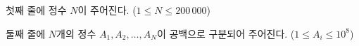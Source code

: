 첫째 줄에 정수 $N$이 주어진다. ($1 \le N \le 200\,000$)

둘째 줄에 $N$개의 정수 $A_1, A_2, \ldots, A_N$이 공백으로 구분되어 주어진다. ($1 \le A_i \le 10^8$)